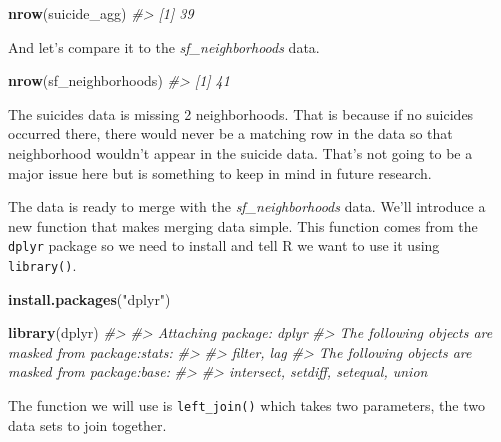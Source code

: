 \documentclass[
  12pt,
]{book}
\newenvironment{Shaded}{\begin{snugshade}}{\end{snugshade}}
\newcommand{\CommentTok}[1]{\textcolor[rgb]{0.56,0.35,0.01}{\textit{#1}}}
\newcommand{\KeywordTok}[1]{\textcolor[rgb]{0.13,0.29,0.53}{\textbf{#1}}}
\newcommand{\NormalTok}[1]{#1}
\newcommand{\StringTok}[1]{\textcolor[rgb]{0.31,0.60,0.02}{#1}}
\begin{document}
\begin{Shaded}
\begin{Highlighting}[]
\KeywordTok{nrow}\NormalTok{(suicide\_agg)}
\CommentTok{\#> [1] 39}
\end{Highlighting}
\end{Shaded}

And let's compare it to the \emph{sf\_neighborhoods} data.

\begin{Shaded}
\begin{Highlighting}[]
\KeywordTok{nrow}\NormalTok{(sf\_neighborhoods)}
\CommentTok{\#> [1] 41}
\end{Highlighting}
\end{Shaded}

The suicides data is missing 2 neighborhoods. That is because if no suicides occurred there, there would never be a matching row in the data so that neighborhood wouldn't appear in the suicide data. That's not going to be a major issue here but is something to keep in mind in future research.

The data is ready to merge with the \emph{sf\_neighborhoods} data. We'll introduce a new function that makes merging data simple. This function comes from the \texttt{dplyr} package so we need to install and tell R we want to use it using \texttt{library()}.

\begin{Shaded}
\begin{Highlighting}[]
\KeywordTok{install.packages}\NormalTok{(}\StringTok{"dplyr"}\NormalTok{)}
\end{Highlighting}
\end{Shaded}

\begin{Shaded}
\begin{Highlighting}[]
\KeywordTok{library}\NormalTok{(dplyr)}
\CommentTok{\#> }
\CommentTok{\#> Attaching package: \textquotesingle{}dplyr\textquotesingle{}}
\CommentTok{\#> The following objects are masked from \textquotesingle{}package:stats\textquotesingle{}:}
\CommentTok{\#> }
\CommentTok{\#>     filter, lag}
\CommentTok{\#> The following objects are masked from \textquotesingle{}package:base\textquotesingle{}:}
\CommentTok{\#> }
\CommentTok{\#>     intersect, setdiff, setequal, union}
\end{Highlighting}
\end{Shaded}

The function we will use is \texttt{left\_join()} which takes two parameters, the two data sets to join together.
\end{document}
